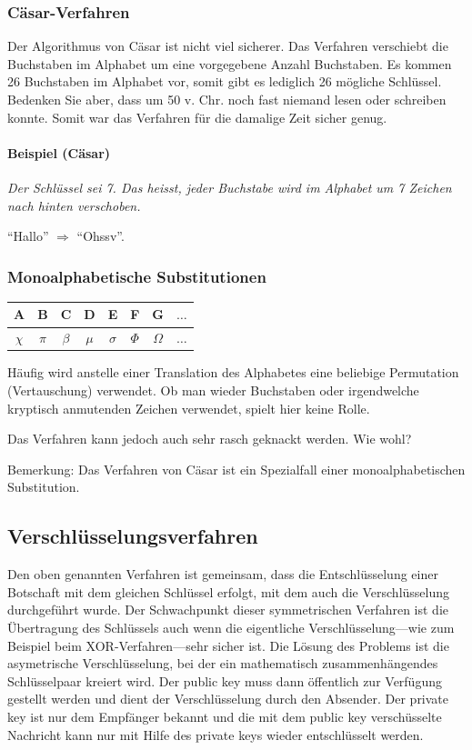 \subsubsection*{Cäsar-Verfahren}

Der Algorithmus von Cäsar ist nicht viel sicherer. Das Verfahren verschiebt
die Buchstaben im Alphabet um eine vorgegebene Anzahl Buchstaben. Es kommen
26 Buchstaben im Alphabet vor, somit gibt es lediglich 26 mögliche Schlüssel.
Bedenken Sie aber, dass um 50 v. Chr. noch fast niemand lesen oder schreiben konnte.
Somit war das Verfahren für die damalige Zeit sicher genug.


\paragraph*{Beispiel (Cäsar)}
\emph{Der Schlüssel sei 7. Das heisst, jeder
Buchstabe wird im Alphabet um 7 Zeichen nach hinten verschoben.}

``Hallo'' $\Rightarrow$ ``Ohssv''.

\subsubsection*{Monoalphabetische Substitutionen}
\label{subsubsec:monoalphabetische-substitution}

\begin{tabular}{|c|c|c|c|c|c|c|c}
    \hline
    A & B & C & D & E & F & G &  $\ldots$ \\ \hline
    $\chi$ & $\pi$ & $\beta$ & $\mu$ & $\sigma$ & $\Phi$ & $\Omega$ &  $\ldots$ \\ \hline
\end{tabular}

Häufig wird anstelle einer Translation des Alphabetes eine beliebige
Permutation (Vertauschung) verwendet. Ob man wieder Buchstaben oder
irgendwelche kryptisch anmutenden Zeichen verwendet, spielt hier keine Rolle.

Das Verfahren kann jedoch auch sehr rasch geknackt werden. Wie wohl?

Bemerkung: Das Verfahren von Cäsar ist ein Spezialfall einer
monoalphabetischen Substitution.


\subsection{Verschlüsselungsverfahren}

Den oben genannten Verfahren ist gemeinsam, dass die Entschlüsselung einer
Botschaft mit dem gleichen Schlüssel erfolgt, mit dem auch die Verschlüsselung
durchgeführt wurde. Der Schwachpunkt dieser symmetrischen Verfahren ist die
Übertragung des Schlüssels auch wenn die eigentliche Verschlüsselung---wie
zum Beispiel beim XOR-Verfahren---sehr sicher ist. Die Lösung des Problems
ist die asymetrische Verschlüsselung, bei der ein mathematisch
zusammenhängendes Schlüsselpaar kreiert wird. Der public key muss dann
öffentlich zur Verfügung gestellt werden und dient der Verschlüsselung
durch den Absender. Der private key ist nur dem Empfänger bekannt und die
mit dem public key verschüsselte Nachricht kann nur mit Hilfe des private
keys wieder entschlüsselt werden.

